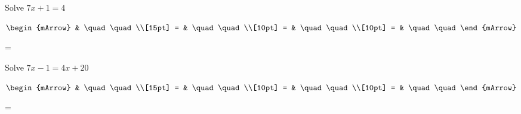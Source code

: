\begin{mtask}[resume]
\begin{exercise}
\begin{envSolution}
           \end{envSolution}
         \end{exercise}
   \task \begin{exercise} Solve $7x + 1 = 4 $
           \begin{envSolution}
             $\begin{mArrow} 
			       & \quad \quad              \\[15pt]
                 = & \quad \quad              \\[10pt]
		   		 = & \quad \quad              \\[10pt]
				 = & \quad \quad 
              \end{mArrow}$
            \begin{shortsolution}  
			     =$ \quad \quad \quad \quad$
			\end{shortsolution}				 
           \end{envSolution}
         \end{exercise}
\end{mtask}

\begin{mtask}[resume]
   \task \begin{exercise} Solve $7x - 1 = 4x +20 $
           \begin{envSolution}
             $\begin{mArrow} 
			       & \quad \quad              \\[15pt]
                 = & \quad \quad              \\[10pt]
		   		 = & \quad \quad              \\[10pt]
				 = & \quad \quad 
              \end{mArrow}$
            \begin{shortsolution}  
			     =$ \quad \quad \quad \quad$
			\end{shortsolution}				 
           \end{envSolution}
         \end{exercise}


\end{mtask}












